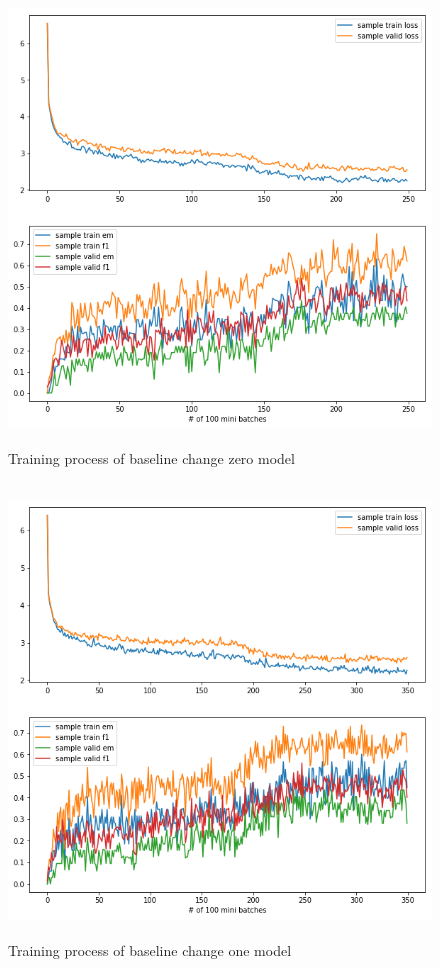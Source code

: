 \documentclass[modernstyle,12pt]{sjsuthesis}
\theoremstyle{definition}
\begin{document}
\begin{figure}[htbp]\centering
  \includegraphics[width=12cm, height=12cm]{figures/match_baseline.png}
  \caption{Training process of baseline change zero model}
  \label{f:baseline_change0}
\end{figure}

\begin{figure}[htbp]\centering
  \includegraphics[width=12cm, height=12cm]{figures/match_change1.png}
  \caption{Training process of baseline change one model}
  \label{f:baseline_change1}
\end{figure}
\end{document}
